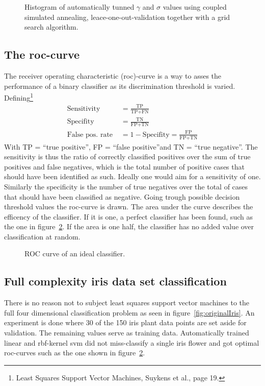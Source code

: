 \begin{figure}
\centering


\caption{Histogram of automatically tunned  $\gamma$ and $\sigma$ values using coupled simulated annealing, leace-one-out-validation together with a grid search algorithm.}
\label{fig:tuneCsaGridLeave}
\end{figure}

\subsection{The roc-curve}
The receiver operating characteristic (roc)-curve is a way to asses the performance of a binary classifier as its discrimination threshold is varied. Defining\footnote{Least Squares Support Vector Machines, Suykens et al., page 19.}
\begin{align}
\text{Sensitivity } &= \frac{\text{TP}}{\text{TP} + \text{FN}} \\ 
\text{Specifity } &= \frac{\text{TN}}{\text{FP} + \text{TN}} \\
\text{False pos. rate } &= 1 - \text{Specifity} = \frac{\text{FP}}{\text{FP} + \text{TN}}
\end{align}
With TP = \textquotedblleft true positive\textquotedblright,
 FP = \textquotedblleft false positive\textquotedblright and
 TN = \textquotedblleft true negative\textquotedblright. The sensitivity is thus the ratio of correctly classified positives over the sum of true positives and false negatives, which is the total number of positive cases that should have been identified as such. Ideally one would aim for a sensitivity of one. Similarly the specificity is the number of true negatives over the total of cases that should have been classified as negative.
Going trough possible decision threshold values the roc-curve is drawn. The area under the curve describes the efficency of the classifier. If it is one, a perfect classifier has been found, such as the one in figure~\ref{fig:roc}. If the area is one half, the classifier has no added value over classification at random.  
 

\begin{figure}
\centering

\caption{ROC curve of an ideal classifier.}
\label{fig:roc}
\end{figure}


\subsection{Full complexity iris data set classification}
There is no reason not to subject least squares support vector machines to the full four dimensional classification problem as seen in figure~\ref{fig:originalIris}. An experiment is done where 30 of the 150 iris plant data points are set aside for validation. The remaining values serve as training data. Automatically trained linear and rbf-kernel svm did not miss-classify a single iris flower and got optimal roc-curves such as the one shown in figure~\ref{fig:roc}.